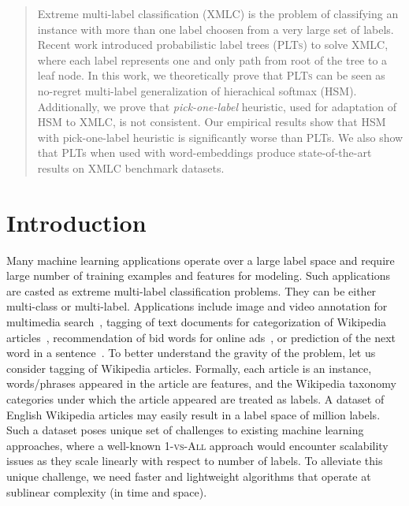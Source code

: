 \documentclass{article}
\newcommand{\Algo}[1]{\textsc{#1}}
\begin{document}
\printAffiliationsAndNotice{\icmlEqualContribution} %

\begin{abstract}
Extreme multi-label classification (XMLC) is the problem of
classifying an instance with more than one label choosen from a very
large set of labels.  Recent work introduced probabilistic label trees
(\Algo{PLTs}) to solve XMLC, where each label represents one and only
path from root of the tree to a leaf node.  In this work, we
theoretically prove that \Algo{PLTs} can be seen as no-regret
multi-label generalization of hierachical softmax
(\Algo{HSM}). Additionally, we prove that \emph{pick-one-label}
heuristic, used for adaptation of HSM to XMLC, is not consistent. Our
empirical results show that HSM with pick-one-label heuristic is
significantly worse than PLTs. We also show that PLTs when used with
word-embeddings produce state-of-the-art results on XMLC benchmark
datasets.

%
\end{abstract}

\section{Introduction}
\label{sec:introduction}

Many machine learning applications operate over a large label space
and require large number of training examples and features for
modeling. Such applications are casted as extreme multi-label
classification problems. They can be either multi-class or
multi-label. Applications include image and video
annotation for multimedia search~\citep{Deng_et_al_2011}, tagging of text documents for categorization of Wikipedia articles~\citep{Dekel_Shamir_2010}, recommendation of bid
words for online ads~\citep{Prabhu_Varma_2014}, or prediction of the
next word in a sentence~\citep{Mikolov_et_al_2013}.
%
To better understand the gravity of the problem, let us consider
tagging of Wikipedia articles. Formally, each article is an instance,
words/phrases appeared in the article are features, and the Wikipedia
taxonomy categories under which the article appeared are treated as
labels. A dataset of English Wikipedia articles may easily result in a
label space of million labels. Such a dataset poses unique set of
challenges to existing machine learning approaches, where a well-known
\Algo{1-vs-All} approach would encounter scalability issues as they
scale linearly with respect to number of labels.  To alleviate this
unique challenge, we need faster and lightweight algorithms that
operate at sublinear complexity (in time and space).
\end{document}
